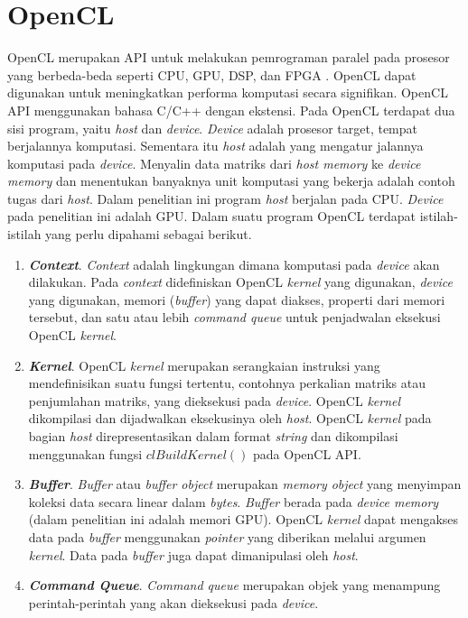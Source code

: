 \section{OpenCL}
OpenCL merupakan API untuk melakukan pemrograman paralel pada prosesor yang berbeda-beda seperti CPU, GPU, DSP, dan FPGA \cite{opencl}. OpenCL dapat digunakan untuk meningkatkan performa komputasi secara signifikan. OpenCL API menggunakan bahasa C/C++ dengan ekstensi. Pada OpenCL terdapat dua sisi program, yaitu \textit{host} dan \textit{device}. \textit{Device} adalah prosesor target, tempat berjalannya komputasi. Sementara itu \textit{host} adalah yang mengatur jalannya komputasi pada \textit{device}. Menyalin data matriks dari \textit{host memory} ke \textit{device memory} dan menentukan banyaknya unit komputasi yang bekerja adalah contoh tugas dari \textit{host}. Dalam penelitian ini program \textit{host} berjalan pada CPU. \textit{Device} pada penelitian ini adalah GPU. Dalam suatu program OpenCL terdapat istilah-istilah yang perlu dipahami sebagai berikut.

\begin{enumerate}
	\item \textbf{\textit{Context}}. \textit{Context} adalah lingkungan dimana komputasi pada \textit{device} akan dilakukan. Pada \textit{context} didefiniskan OpenCL \textit{kernel} yang digunakan, \textit{device} yang digunakan, memori (\textit{buffer}) yang dapat diakses, properti dari memori tersebut, dan satu atau lebih \textit{command queue} untuk penjadwalan eksekusi OpenCL \textit{kernel}.
	
	\item \textbf{\textit{Kernel}}. OpenCL \textit{kernel} merupakan serangkaian instruksi yang mendefinisikan suatu fungsi tertentu, contohnya perkalian matriks atau penjumlahan matriks, yang dieksekusi pada \textit{device}. OpenCL \textit{kernel} dikompilasi dan dijadwalkan eksekusinya oleh \textit{host}. OpenCL \textit{kernel} pada bagian \textit{host} direpresentasikan dalam format \textit{string} dan dikompilasi menggunakan fungsi $clBuildKernel()$ pada OpenCL API.
	
	\item \textbf{\textit{Buffer}}. \textit{Buffer} atau \textit{buffer object} merupakan \textit{memory object} yang menyimpan koleksi data secara linear dalam \textit{bytes}. \textit{Buffer} berada pada \textit{device memory} (dalam penelitian ini adalah memori GPU). OpenCL \textit{kernel} dapat mengakses data pada \textit{buffer} menggunakan \textit{pointer} yang diberikan melalui argumen \textit{kernel}. Data pada \textit{buffer} juga dapat dimanipulasi oleh \textit{host}.
	
	\item \textbf{\textit{Command Queue}}. \textit{Command queue} merupakan objek yang menampung perintah-perintah yang akan dieksekusi pada \textit{device}.
\end{enumerate}

